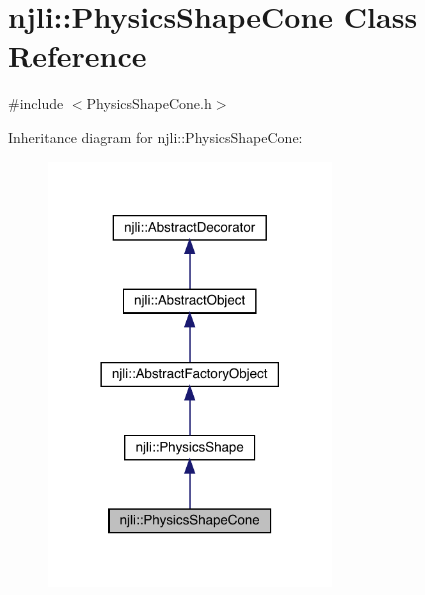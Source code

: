 \hypertarget{classnjli_1_1_physics_shape_cone}{}\section{njli\+:\+:Physics\+Shape\+Cone Class Reference}
\label{classnjli_1_1_physics_shape_cone}


{\ttfamily \#include $<$Physics\+Shape\+Cone.\+h$>$}



Inheritance diagram for njli\+:\+:Physics\+Shape\+Cone\+:\nopagebreak
\begin{figure}[H]
\begin{center}
\leavevmode
\includegraphics[width=213pt]{classnjli_1_1_physics_shape_cone__inherit__graph}
\end{center}
\end{figure}


